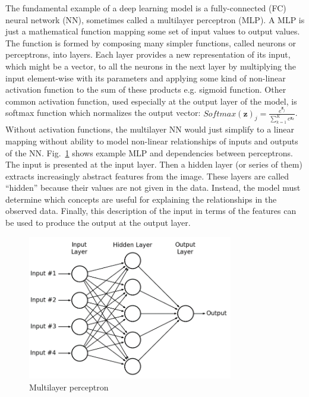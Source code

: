 The fundamental example of a deep learning model is a fully-connected (FC) neural network (NN), sometimes called a multilayer perceptron (MLP). A MLP is just a mathematical function mapping some set of input values to output values. The function is formed by composing many simpler functions, called neurons or perceptrons, into layers. Each layer provides a new representation of its input, which might be a vector, to all the neurons in the next layer by multiplying the input element-wise with its parameters and applying some kind of non-linear activation function to the sum of these products e.g. sigmoid function. Other common activation function, used especially at the output layer of the model, is softmax function which normalizes the output vector: $Softmax(\mathbf{z})_{j} = \frac{e^{\mathbf{z}_{j}}}{\sum_{k=1}^{K} e^{\mathbf{z}_{k}}}$. Without activation functions, the multilayer NN would just simplify to a linear mapping without ability to model non-linear relationships of inputs and outputs of the NN. Fig.~\ref{Fig.MLP} shows example MLP and dependencies between perceptrons. The input is presented at the input layer. Then a hidden layer (or series of them) extracts increasingly abstract features from the image. These layers are called “hidden” because their values are not given in the data. Instead, the model must determine which concepts are useful for explaining the relationships in the observed data. Finally, this description of the input in terms of the features can be used to produce the output at the output layer.

\begin{figure}[H]
\includegraphics[width=0.8\textwidth,keepaspectratio]{figures/MLP.png}
\caption{Multilayer perceptron}
\label{Fig.MLP}
\end{figure}

